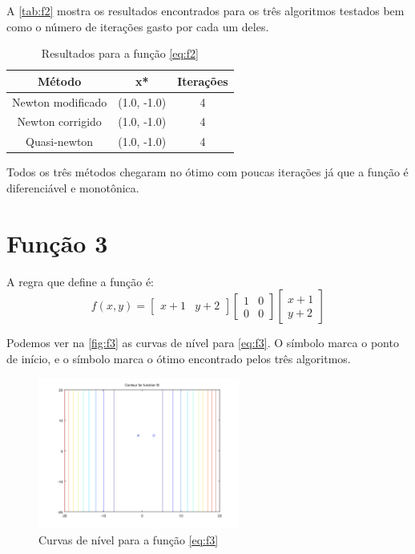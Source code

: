 \documentclass[12pt]{article}
\begin{document}
A \autoref{tab:f2} mostra os resultados encontrados para os três algoritmos testados bem como o número de iterações gasto por cada um deles. 

\begin{table}[H]
\centering
\begin{tabular}{*3c}
\toprule
Método			&	x*		&	Iterações\\
\midrule
Newton modificado	&	(1.0, -1.0)	&	4\\
Newton corrigido	&	(1.0, -1.0)	&	4\\
Quasi-newton		&	(1.0, -1.0)	&	4\\
\bottomrule
\end{tabular}
\caption{\small{Resultados para a função \autoref{eq:f2} }}
\label{tab:f2}
\end{table}

Todos os três métodos chegaram no ótimo com poucas iterações já que a função é diferenciável e monotônica.


\section{Função 3}
A regra que define a função é:
\begin{equation}
\label{eq:f3}
f(x, y) = 
	   \begin{bmatrix}
            x + 1 & y + 2
           \end{bmatrix}            
           \begin{bmatrix}
	   1 	& 0 \\
	   0	& 0
           \end{bmatrix} 
           \begin{bmatrix}
	   x + 1 \\
	   y + 2
           \end{bmatrix}
\end{equation}

Podemos ver na \autoref{fig:f3} as curvas de nível para \autoref{eq:f3}. O símbolo \textit{\textopenbullet} marca o ponto de início,
e o símbolo \textit{\texttimes} marca o ótimo encontrado pelos três algoritmos.

\begin{figure}[H]
  \centering
  \includegraphics[width=250px]{../matlab/images/f3_contour}
  \caption{Curvas de nível para a função \autoref{eq:f3}}
  \label{fig:f3}
\end{figure}
\end{document}
